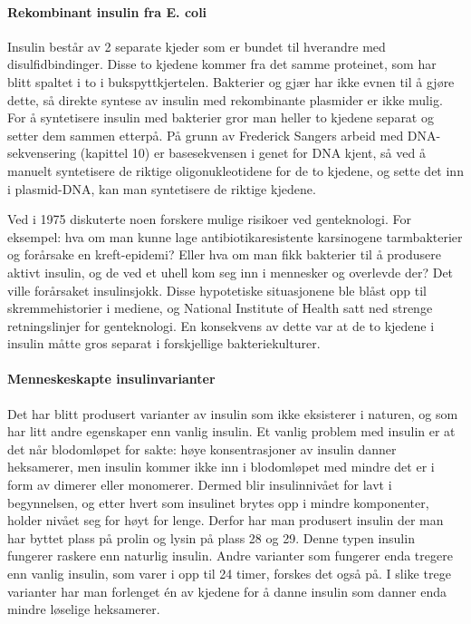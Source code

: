 \paragraph{Rekombinant insulin fra E. coli} Insulin består av 2 separate kjeder som er bundet til hverandre med disulfidbindinger. Disse to kjedene kommer fra det samme proteinet, som har blitt spaltet i to i bukspyttkjertelen. Bakterier og gjær har ikke evnen til å gjøre dette, så direkte syntese av insulin med rekombinante plasmider er ikke mulig. For å syntetisere insulin med bakterier gror man heller to kjedene separat og setter dem sammen etterpå. På grunn av Frederick Sangers arbeid med DNA-sekvensering (kapittel 10) er basesekvensen i genet for DNA kjent, så ved å manuelt syntetisere de riktige oligonukleotidene for de to kjedene, og sette det inn i plasmid-DNA, kan man syntetisere de riktige kjedene.

Ved  i 1975 diskuterte noen forskere mulige risikoer ved genteknologi. For eksempel: hva om man kunne lage antibiotikaresistente karsinogene tarmbakterier og forårsake en kreft-epidemi? Eller hva om man fikk bakterier til å produsere aktivt insulin, og de ved et uhell kom seg inn i mennesker og overlevde der? Det ville forårsaket insulinsjokk. Disse hypotetiske situasjonene ble blåst opp til skremmehistorier i mediene, og National Institute of Health satt ned strenge retningslinjer for genteknologi. En konsekvens av dette var at de to kjedene i insulin måtte gros separat i forskjellige bakteriekulturer.

\paragraph{Menneskeskapte insulinvarianter} Det har blitt produsert varianter av insulin som ikke eksisterer i naturen, og som har litt andre egenskaper enn vanlig insulin. Et vanlig problem med insulin er at det når blodomløpet for sakte: høye konsentrasjoner av insulin danner heksamerer, men insulin kommer ikke inn i blodomløpet med mindre det er i form av dimerer eller monomerer. Dermed blir insulinnivået for lavt i begynnelsen, og etter hvert som insulinet brytes opp i mindre komponenter, holder nivået seg for høyt for lenge. Derfor har man produsert insulin der man har byttet plass på prolin og lysin på plass 28 og 29. Denne typen insulin fungerer raskere enn naturlig insulin. Andre varianter som fungerer enda tregere enn vanlig insulin, som varer i opp til 24 timer, forskes det også på. I slike trege varianter har man forlenget én av kjedene for å danne insulin som danner enda mindre løselige heksamerer.
